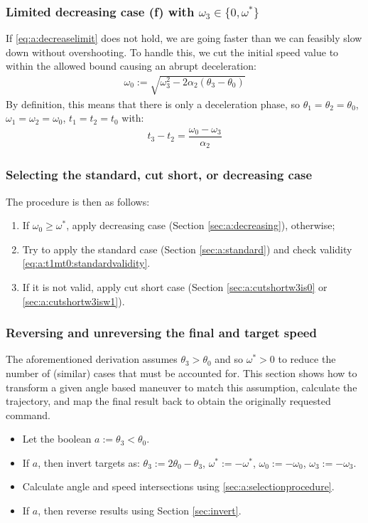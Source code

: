 \documentclass[12pt, a4paper]
{article}
\providecommand{\lr}[1]{\left(#1\right)}
\providecommand{\w}{\omega}
\providecommand{\wt}{\w^*}
\renewcommand{\th}{\theta}
\renewcommand{\a}{\alpha}
\begin{document}
\subsubsection{Limited decreasing case (f) with $\w_3 \in \{0, \wt\}$}

If \eqref{eq:a:decreaselimit} does not hold, we are going faster than we
can feasibly slow down without overshooting. To handle this, we cut the
initial speed value to within the allowed bound causing an abrupt deceleration:
%
\begin{align}
    \w_0 := \sqrt{\w_3^2 - 2\a_2\lr{\th_3-\th_0}}
\end{align}
%
By definition, this means that there is only a deceleration phase, so
$\th_1 = \th_2 = \th_0$, $\w_1=\w_2=\w_0$, $t_1=t_2=t_0$ with:
%
\begin{align}
    \label{eq:a:decreaselimittime}
    t_3 - t_2 = \dfrac{\w_0-\w_3}{\a_2}
\end{align}

\subsubsection{Selecting the standard, cut short, or decreasing case}
\label{sec:a:selectionprocedure}
The procedure is then as follows:
\begin{enumerate}
    \item If $\w_0 \geq \wt$, apply decreasing case (Section
    \ref{sec:a:decreasing}), otherwise;
    \item Try to apply the standard case (Section \ref{sec:a:standard}) and
    check validity \eqref{eq:a:t1mt0:standardvalidity}.
    \item If it is not valid, apply cut short case (Section
    \ref{sec:a:cutshortw3is0} or \ref{sec:a:cutshortw3isw1}).
\end{enumerate}
%

\subsubsection{Reversing and unreversing the final and target speed}
\label{sec:a:reversing}
The aforementioned derivation assumes $\th_3 > \th_0$ and so $\wt > 0$ to
reduce the number of (similar) cases that must be accounted for. This section
shows how to transform a given angle based maneuver to match this assumption,
calculate the trajectory, and map the final result back to obtain the
originally requested command.

\begin{itemize}
    \item Let the boolean $a := \th_3 < \th_0$.
    \item If $a$, then invert targets as:
          $\th_3 := 2 \th_0 - \th_3$, $\wt := -\wt$, $\w_0 := -\w_0$,
          $\w_3 := -\w_3$.
    \item Calculate angle and speed intersections using
    \eqref{sec:a:selectionprocedure}.
    \item If $a$, then reverse results using Section \ref{sec:invert}.
\end{itemize}
\end{document}
